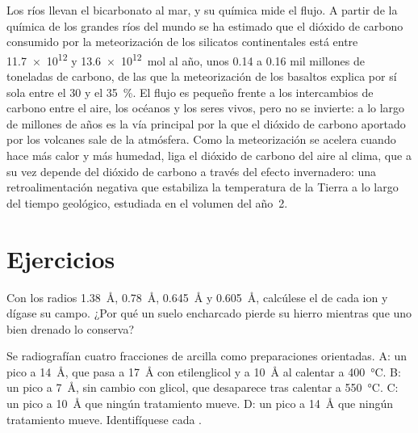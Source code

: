 Los ríos llevan el bicarbonato al mar, y su química mide el flujo. A partir de la química de los grandes ríos del mundo se ha estimado que el dióxido
de carbono consumido por la meteorización de los silicatos continentales está entre \num{11.7e12} y \qty{13.6e12}{mol} al año, unos 0.14 a 0.16 mil millones de
toneladas de carbono, de las que la meteorización de los basaltos explica por sí sola entre el 30 y el \qty{35}{\percent}. El flujo es pequeño frente
a los intercambios de carbono entre el aire, los océanos y los seres vivos, pero no se invierte: a lo largo de millones de años es la vía principal por la que
el dióxido de carbono aportado por los volcanes sale de la atmósfera. Como la meteorización se acelera cuando hace más calor y más humedad, liga el dióxido
de carbono del aire al clima, que a su vez depende del dióxido de carbono a través del efecto invernadero: una retroalimentación negativa que estabiliza la
temperatura de la Tierra a lo largo del tiempo geológico, estudiada en el volumen del año~2.

\section{Ejercicios}

\begin{exercise}[$\star$]\label{exo:b1:weathering-clays:1}
Con los radios  \qty{1.38}{\angstrom},  \qty{0.78}{\angstrom},  \qty{0.645}{\angstrom} y  \qty{0.605}{\angstrom},
calcúlese el  de cada ion y dígase su campo. ¿Por qué un suelo encharcado pierde su hierro mientras que uno bien drenado lo conserva?
\end{exercise}

\begin{exercise}[$\star$]\label{exo:b1:weathering-clays:2}
Se radiografían cuatro fracciones de arcilla como preparaciones orientadas. A: un pico a
\SI{14}{\angstrom}, que pasa a \SI{17}{\angstrom} con etilenglicol y a \SI{10}{\angstrom} al calentar a \SI{400}{\celsius}. B: un pico a
\SI{7}{\angstrom}, sin cambio con glicol, que desaparece tras calentar a \SI{550}{\celsius}. C: un pico a \SI{10}{\angstrom} que ningún tratamiento
mueve. D: un pico a \SI{14}{\angstrom} que ningún tratamiento mueve. Identifíquese cada .
\end{exercise}

